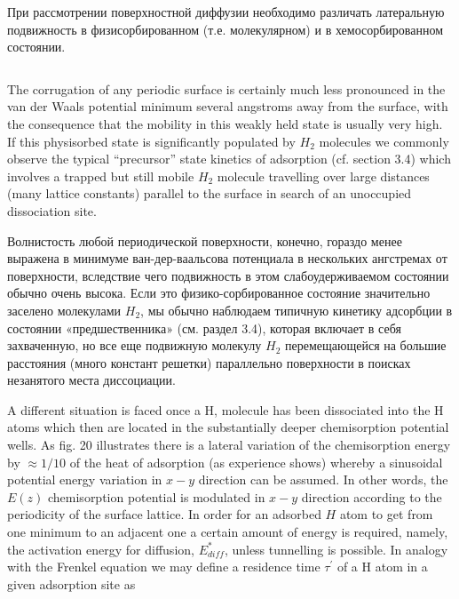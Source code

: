 \documentclass[11pt]{article}
\makeatletter
\newcommand{\boxspacing}{\kern\kvtcb@left@rule\kern\kvtcb@boxsep}
\newcommand{\prompt}[4]{
        {\ttfamily\llap{{\color{#2}[#3]:\hspace{3pt}#4}}\vspace{-\baselineskip}}
    }
\makeatother
\begin{document}
При рассмотрении поверхностной диффузии необходимо различать латеральную
подвижность в физисорбированном (т.е. молекулярном) и в
хемосорбированном состоянии.

    \begin{tcolorbox}[breakable, size=fbox, boxrule=1pt, pad at break*=1mm,colback=cellbackground, colframe=cellborder]
\prompt{In}{incolor}{ }{\boxspacing}
\begin{Verbatim}[commandchars=\\\{\}]

\end{Verbatim}
\end{tcolorbox}

    The corrugation of any periodic surface is certainly much less
pronounced in the van der Waals potential minimum several angstroms away
from the surface, with the consequence that the mobility in this weakly
held state is usually very high. If this physisorbed state is
significantly populated by \(H_2\) molecules we commonly observe the
typical ``precursor'' state kinetics of adsorption (cf. section 3.4)
which involves a trapped but still mobile \(H_2\) molecule travelling
over large distances (many lattice constants) parallel to the surface in
search of an unoccupied dissociation site.

Волнистость любой периодической поверхности, конечно, гораздо менее
выражена в минимуме ван-дер-ваальсова потенциала в нескольких ангстремах
от поверхности, вследствие чего подвижность в этом слабоудерживаемом
состоянии обычно очень высока. Если это физико-сорбированное состояние
значительно заселено молекулами \(H_2\), мы обычно наблюдаем типичную
кинетику адсорбции в состоянии «предшественника» (см. раздел 3.4),
которая включает в себя захваченную, но все еще подвижную молекулу
\(H_2\) перемещающейся на большие расстояния (много констант решетки)
параллельно поверхности в поисках незанятого места диссоциации.

    A different situation is faced once a H, molecule has been dissociated
into the H atoms which then are located in the substantially deeper
chemisorption potential wells. As fig. 20 illustrates there is a lateral
variation of the chemisorption energy by \(\approx 1/10\) of the heat of
adsorption (as experience shows) whereby a sinusoidal potential energy
variation in \(x-y\) direction can be assumed. In other words, the
\(E(z)\) chemisorption potential is modulated in \(x-y\) direction
according to the periodicity of the surface lattice. In order for an
adsorbed \(H\) atom to get from one minimum to an adjacent one a certain
amount of energy is required, namely, the activation energy for
diffusion, \(E^{*}_{diff}\), unless tunnelling is possible. In analogy
with the Frenkel equation we may define a residence time
\(\tau^{\prime}\) of a H atom in a given adsorption site as
\end{document}
